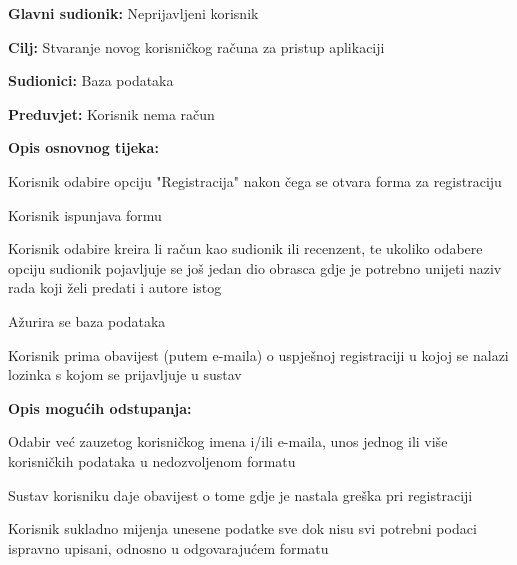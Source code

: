 					\noindent {}
					\begin{packed_item}
	
						\item \textbf{Glavni sudionik: } Neprijavljeni korisnik
						\item  \textbf{Cilj:} Stvaranje novog korisničkog računa za pristup aplikaciji
						\item  \textbf{Sudionici:} Baza podataka
						\item  \textbf{Preduvjet:} Korisnik nema račun
						\item  \textbf{Opis osnovnog tijeka:}
						
						\item[] \begin{packed_enum}
	
							\item Korisnik odabire opciju "Registracija" nakon čega se otvara forma za registraciju
							\item Korisnik ispunjava formu
							\item Korisnik odabire kreira li račun kao sudionik ili recenzent, te ukoliko odabere opciju sudionik pojavljuje se još jedan dio obrasca gdje je potrebno unijeti naziv rada koji želi predati i autore istog
							\item Ažurira se baza podataka
							\item Korisnik prima obavijest (putem e-maila) o uspješnoj registraciji u kojoj se nalazi lozinka s kojom se prijavljuje u sustav
						\end{packed_enum}

						\item  \textbf{Opis mogućih odstupanja:}
						
						\item[] \begin{packed_item}
	
							\item[2.a]  Odabir već zauzetog korisničkog imena i/ili e-maila, unos jednog ili više korisničkih podataka u nedozvoljenom formatu
							\item[] \begin{packed_enum}
								
								\item Sustav korisniku daje obavijest o tome gdje je nastala greška pri registraciji
								\item Korisnik sukladno mijenja unesene podatke sve dok nisu svi potrebni podaci ispravno upisani, odnosno u odgovarajućem formatu
								
							\end{packed_enum}
							
						\end{packed_item}
			
					\end{packed_item}

